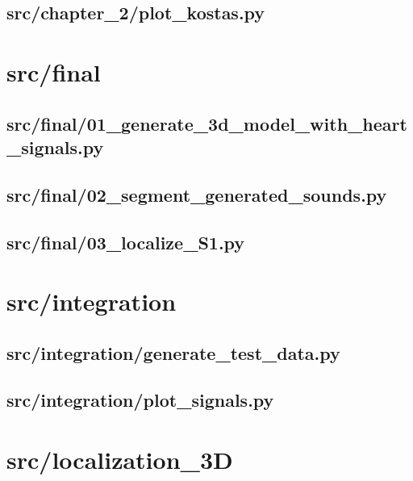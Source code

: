 \subsection*{src/chapter\_2/plot\_kostas.py}
\label{ap:plot_kostas}
\section{src/final}

\subsection*{src/final/01\_generate\_3d\_model\_with\_heart\_signals.py}
\label{ap:01_generate_3d_model_with_heart_signals}

\subsection*{src/final/02\_segment\_generated\_sounds.py}
\label{ap:02_segment_generated_sounds}

\subsection*{src/final/03\_localize\_S1.py}
\label{ap:03_localize_S1}
\section{src/integration}

\subsection*{src/integration/generate\_test\_data.py}
\label{ap:generate_test_data}

\subsection*{src/integration/plot\_signals.py}
\label{ap:plot_signals}
\section{src/localization\_3D}

